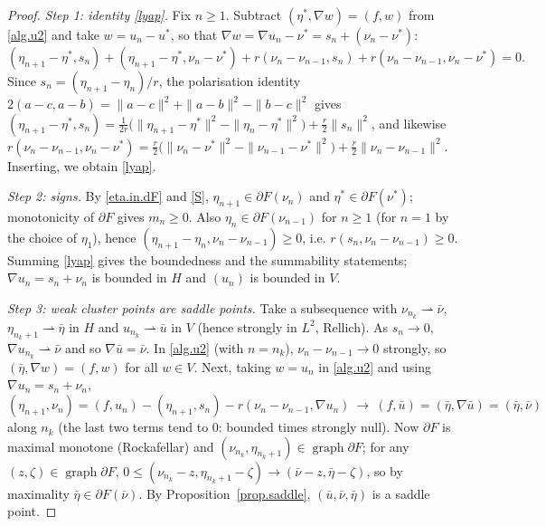\documentclass[11pt]{amsart}
\theoremstyle{remark}
\theoremstyle{definition}
\begin{document}
\begin{proof}
\emph{Step 1: identity \eqref{lyap}.} Fix $n\ge1$. Subtract $(\eta^*,\nabla w)=(f,w)$ from \eqref{alg.u2} and take $w=u_n-u^*$, so that $\nabla w=\nabla u_n-\nu^*=s_n+(\nu_n-\nu^*)$:
\[
(\eta_{n+1}-\eta^*,s_n)+(\eta_{n+1}-\eta^*,\nu_n-\nu^*)+r(\nu_n-\nu_{n-1},s_n)+r(\nu_n-\nu_{n-1},\nu_n-\nu^*)=0 .
\]
Since $s_n=(\eta_{n+1}-\eta_n)/r$, the polarisation identity $2(a-c,a-b)=\|a-c\|^2+\|a-b\|^2-\|b-c\|^2$ gives
$(\eta_{n+1}-\eta^*,s_n)=\frac1{2r}\big(\|\eta_{n+1}-\eta^*\|^2-\|\eta_n-\eta^*\|^2\big)+\frac r2\|s_n\|^2$, and likewise
$r(\nu_n-\nu_{n-1},\nu_n-\nu^*)=\frac r2\big(\|\nu_n-\nu^*\|^2-\|\nu_{n-1}-\nu^*\|^2\big)+\frac r2\|\nu_n-\nu_{n-1}\|^2$. Inserting, we obtain \eqref{lyap}.

\emph{Step 2: signs.} By \eqref{eta.in.dF} and \eqref{S}, $\eta_{n+1}\in\partial F(\nu_n)$ and $\eta^*\in\partial F(\nu^*)$; monotonicity of $\partial F$ gives $m_n\ge0$. Also $\eta_n\in\partial F(\nu_{n-1})$ for $n\ge1$ (for $n=1$ by the choice of $\eta_1$), hence $(\eta_{n+1}-\eta_n,\nu_n-\nu_{n-1})\ge0$, i.e. $r(s_n,\nu_n-\nu_{n-1})\ge0$.
Summing \eqref{lyap} gives the boundedness and the summability statements; $\nabla u_n=s_n+\nu_n$ is bounded in $H$ and $(u_n)$ is bounded in $V$.

\emph{Step 3: weak cluster points are saddle points.} Take a subsequence with $\nu_{n_k}\rightharpoonup\bar\nu$, $\eta_{n_k+1}\rightharpoonup\bar\eta$ in $H$ and $u_{n_k}\rightharpoonup\bar u$ in $V$ (hence strongly in $L^2$, Rellich). As $s_n\to0$, $\nabla u_{n_k}\rightharpoonup\bar\nu$ and so $\nabla\bar u=\bar\nu$. In \eqref{alg.u2} (with $n=n_k$), $\nu_n-\nu_{n-1}\to0$ strongly, so $(\bar\eta,\nabla w)=(f,w)$ for all $w\in V$. Next, taking $w=u_n$ in \eqref{alg.u2} and using $\nabla u_n=s_n+\nu_n$,
\[
(\eta_{n+1},\nu_n)=(f,u_n)-(\eta_{n+1},s_n)-r(\nu_n-\nu_{n-1},\nabla u_n)\ \longrightarrow\ (f,\bar u)=(\bar\eta,\nabla\bar u)=(\bar\eta,\bar\nu)
\]
along $n_k$ (the last two terms tend to $0$: bounded times strongly null). Now $\partial F$ is maximal monotone (Rockafellar) and $(\nu_{n_k},\eta_{n_k+1})\in\operatorname{graph}\partial F$; for any $(z,\zeta)\in\operatorname{graph}\partial F$, $0\le(\nu_{n_k}-z,\eta_{n_k+1}-\zeta)\to(\bar\nu-z,\bar\eta-\zeta)$, so by maximality $\bar\eta\in\partial F(\bar\nu)$. By Proposition~\ref{prop.saddle}, $(\bar u,\bar\nu,\bar\eta)$ is a saddle point.


\end{proof}
\end{document}
